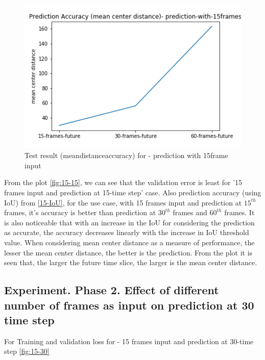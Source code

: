 \begin{figure}[H] 
\includegraphics[scale=0.8]{prediction-with-15frames-mean_distance_accuracy}
\begin{center}
\caption{Test result (mean\textunderscore distance\textunderscore accuracy) for - prediction with 15frame input }
\label{15-mcd}
\end{center}
\end{figure}

From the plot \ref{fig:15-15}, we can see that the validation error is least for '15 frames input and prediction at 15-time step' case. Also prediction accuracy (using IoU) from \ref{15-IoU}, for the use case, with 15 frames input and prediction at $15^{th}$ frames, it's accuracy is better than prediction at $30^{th}$ frames and $60^{th}$ frames. It is also noticeable that with an increase in the IoU for considering the prediction as accurate, the accuracy decreases linearly with the increase in IoU threshold value. When considering mean center distance as a measure of performance, the lesser the mean center distance, the better is the prediction. From the plot it is seen that, the larger the future time slice, the larger is the mean center distance.

\subsection{Experiment. Phase 2. Effect of different number of frames as input on prediction at 30  time step}
For Training and validation loss for - 15 frames input and prediction at 30-time step \ref{fig:15-30}

